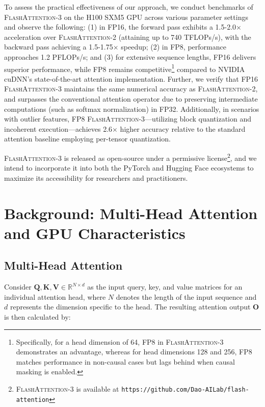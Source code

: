To assess the practical effectiveness of our approach, we conduct benchmarks of \textsc{FlashAttention-3} on the H100 SXM5 GPU across various parameter settings and observe the following: (1) in FP16, the forward pass exhibits a 1.5-2.0$\times$ acceleration over \textsc{FlashAttention-2} (attaining up to 740 TFLOPs/s), with the backward pass achieving a 1.5-1.75$\times$ speedup; (2) in FP8, performance approaches 1.2 PFLOPs/s; and (3) for extensive sequence lengths, FP16 delivers superior performance, while FP8 remains competitive\footnote{Specifically, for a head dimension of 64, FP8 in \textsc{FlashAttention-3} demonstrates an advantage, whereas for head dimensions 128 and 256, FP8 matches performance in non-causal cases but lags behind when causal masking is enabled.} compared to NVIDIA cuDNN's state-of-the-art attention implementation. Further, we verify that FP16 \textsc{FlashAttention-3} maintains the same numerical accuracy as \textsc{FlashAttention-2}, and surpasses the conventional attention operator due to preserving intermediate computations (such as softmax normalization) in FP32. Additionally, in scenarios with outlier features, FP8 \textsc{FlashAttention-3}—utilizing block quantization and incoherent execution—achieves 2.6$\times$ higher accuracy relative to the standard attention baseline employing per-tensor quantization.

\textsc{FlashAttention-3} is released as open-source under a permissive license\footnote{\textsc{FlashAttention-3}
  is available at \texttt{https://github.com/Dao-AILab/flash-attention}}, and we intend to incorporate it into both the PyTorch and Hugging Face ecosystems to maximize its accessibility for researchers and practitioners.

\section{Background: Multi-Head Attention and GPU Characteristics}
\label{sec:background}

\subsection{Multi-Head Attention}
\label{subsec:multi_head_attn}

Consider $\mathbf{Q}, \mathbf{K}, \mathbf{V} \in \mathbb{R}^{N \times d}$ as the input query, key, and value matrices for an individual attention head, where $N$ denotes the length of the input sequence and $d$ represents the dimension specific to the head. The resulting attention output $\mathbf{O}$ is then calculated by:

